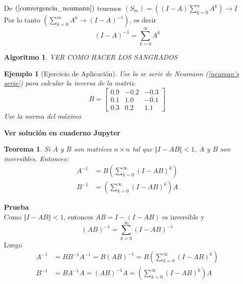 \documentclass[10pt,a4paper]{article}
\newcommand{\ds}{\displaystyle}
\newtheorem{theo}{Teorema}[section]
\newtheorem{example}{Ejemplo}[section]
\newtheorem{algorithm}{Algoritmo}[section]
\begin{document}
De $(\ref{convergencia_neumann})$ tenemos $(S_{m}) = \left((I-A)\ds\sum_{k=0}^{n}A^{k}\right)\rightarrow I$\\
Por lo tanto $\left(\ds\sum_{k=0}^{m}A^{k}\rightarrow (I-A)^{-1}\right)$, es decir
$$(I-A)^{-1} = \sum_{k=0}^{\infty}A^{k}$$

\begin{algorithm}
	VER COMO HACER LOS SANGRADOS
\end{algorithm}

\begin{example}[Ejercicio de Aplicación]
Use la se serie  de Neumann (\ref{neuman's serie}) para calcular la inversa de la matriz.
$$B = \begin{bmatrix}
	0.9	&	-0.2		&	-0.3\\
	0.1	&	1.0		&	-0.1\\
	0.3	&	0.2		&	1.1
\end{bmatrix}$$
Use la norma del máximo
\end{example}
\textbf{Ver solución en cuaderno Jupyter}

\begin{theo}
	Si $A$ y $B$ son matrices $n\times n$ tal que $\Vert I-AB\Vert <1$, $A$ y $B$ son inversibles. Entonces:
	\begin{align*}
		A^{-1} &= B\left(\sum_{k=0}^{\infty} (I-AB)^{k}\right)\\
		B^{-1} &= \left(\sum_{k=0}^{\infty} (I-AB)^{k}\right)A
	\end{align*}
\end{theo}
\textbf{Prueba}\\
Como $\Vert I-AB\Vert < 1$, entonces $AB = I-(I-AB)$ es inversible y
$$(AB)^{-1} = \sum_{k=0}^{\infty}(I-AB)^{-1}$$
Luego
\begin{align*}
	A^{-1} &= BB^{-1}A^{-1} = B(AB)^{-1} = B\left(\sum_{k=0}^{\infty} (I-AB)^{k}\right)\\
	B^{-1} &= BA^{-1}A = (AB)^{-1}A = \left(\sum_{k=0}^{\infty} (I-AB)^{k}\right)A
\end{align*}
\end{document}
